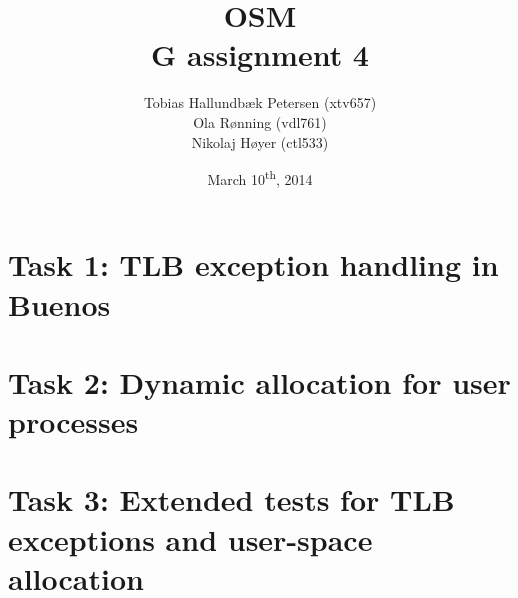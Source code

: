 \documentclass[a4paper,12pt]{article}
\title{OSM\\G assignment 4}
\author{Tobias Hallundbæk Petersen (xtv657)\\Ola Rønning (vdl761)\\Nikolaj Høyer (ctl533)}
\date{March 10\textsuperscript{th}, 2014}
\begin{document}
\maketitle
\tableofcontents
\newpage

\section{Task 1: TLB exception handling in Buenos}

\section{Task 2: Dynamic allocation for user processes}

\section{Task 3: Extended tests for TLB exceptions and user-space allocation}
\end{document}
